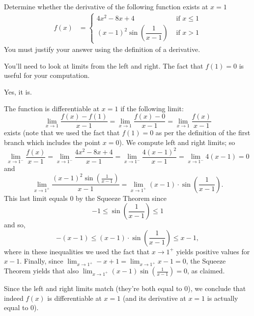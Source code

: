 \begin{question}[2015Q]
Determine whether the derivative of the following function exists at
$x=1$
\begin{align*}
f(x) &=\begin{cases}
  4x^2-8x+4 & \text{ if }  x\le 1\\
  (x-1)^2\sin\left(\dfrac{1}{x-1}\right) & \text{ if } x> 1
\end{cases}
\end{align*}
You must justify your answer using the definition of a derivative.
\end{question}
\begin{hint} You'll need to look at limits from the left and right. The fact that $f(1)=0$ is useful for your computation.
\end{hint}
\begin{answer}
Yes, it is.
\end{answer}
\begin{solution}
The function is differentiable at $x=1$ if the following limit:
$$\lim_{x\to 1}\frac{f(x)-f(1)}{x-1} = \lim_{x\to 1}\frac{f(x)-0}{x-1}=\lim_{x\to 1}
\frac{f(x)}{x-1}$$
exists (note that we used the fact that $f(1)=0$ as per the definition of the first branch which includes the point $x=0$). We compute left and right limits; so
$$\lim_{x\to 1^-}\frac{f(x)}{x-1}=\lim_{x\to 1^-}\frac{4x^2-8x+4}{x-1}=\lim_{x\rightarrow 1^-}\frac{4(x-1)^2}{x-1} =\lim_{x\to 1^-} 4(x-1)=0$$
and
$$\lim_{x\to 1^+}\frac{(x-1)^2\sin\left(\frac{1}{x-1}\right)}{x-1}=\lim_{x\to 1^+}(x-1)\cdot \sin\left(\frac{1}{x-1}\right).$$
This last limit equals $0$ by the Squeeze Theorem since
$$-1\le \sin\left(\frac{1}{x-1}\right)\le 1$$
and so,
$$ -(x-1)\le (x-1)\cdot \sin\left(\frac{1}{x-1}\right)\le x-1,$$
where in these inequalities we used the fact that $x\to 1^+$ yields positive values for
$x-1$. Finally, since $\lim_{x\to 1^+}-x+1=\lim_{x\to 1^+}x-1=0$, the Squeeze Theorem
yields that also $\lim_{x\to 1^+}(x-1)\sin\left(\frac{1}{x-1}\right) =0$, as claimed.

Since the left and right limits match (they're both equal to $0$), we conclude that indeed $f(x)$ is differentiable at $x=1$ (and its derivative at $x=1$ is actually equal to $0$).
\end{solution}




